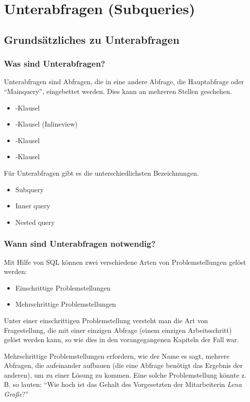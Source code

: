 \chapter{Unterabfragen (Subqueries)}
\label{subqueries}
\chaptertoc{}
\cleardoubleevenpage

\section{Grundsätzliches zu Unterabfragen}
\subsection{Was sind Unterabfragen?}\label{whataresubqueries}
Unterabfragen sind Abfragen, die in eine andere Abfrage, die Hauptabfrage oder \enquote{Mainquery}, eingebettet werden. Dies kann an mehreren Stellen geschehen.
\begin{itemize}
    \item \SELECT-Klausel
    \item \FROM-Klausel (Inlineview)
    \item \WHERE-Klausel
    \item \HAVING-Klausel
\end{itemize}
Für Unterabfragen gibt es die unterschiedlichsten Bezeichnungen.
\begin{itemize}
    \item Subquery
    \item Inner query
    \item Nested query
\end{itemize}
\subsection{Wann sind Unterabfragen notwendig?}
Mit Hilfe von SQL können zwei verschiedene Arten von Problemstellungen gelöst werden:
\begin{itemize}
    \item Einschrittige Problemstellungen
    \item Mehrschrittige Problemstellungen
\end{itemize}
Unter einer einschrittigen Problemstellung versteht man die Art von Fragestellung, die mit einer einzigen Abfrage (einem einzigen Arbeitsschritt) gelöst werden kann, so wie dies in den vorangegangenen Kapiteln der Fall war.

Mehrschrittige Problemstellungen erfordern, wie der Name es sagt, mehrere Abfragen, die aufeinander aufbauen (die eine Abfrage benötigt das Ergebnis der anderen), um zu einer Lösung zu kommen. Eine solche Problemstellung könnte z. B. so lauten: \enquote{Wie hoch ist das Gehalt des Vorgesetzten der Mitarbeiterin \textit{Lena Große}?}

